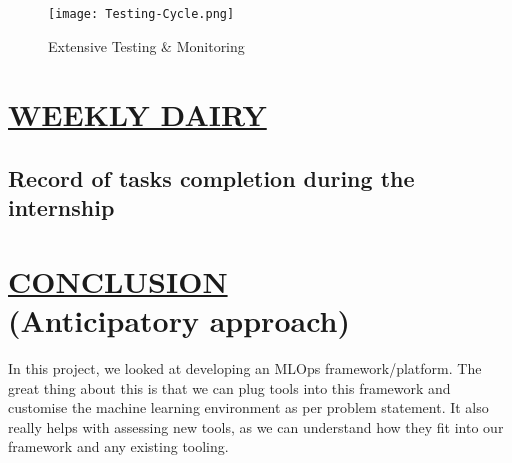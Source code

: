 \documentclass[12pt,oneside,a4paper]{report}
\begin{document}
\begin{figure}[h]
\centering
\texttt{[image: Testing-Cycle.png]}
\caption{Extensive Testing \& Monitoring}
\label{fig_TestingCycle}
\end{figure}


\chapter{\underline{WEEKLY DAIRY}}\vspace{-15.0mm}
\section{Record of tasks completion during the internship}
\begin{table}[ht]
\centering
{}
\end{table}

\chapter{\underline{CONCLUSION}\\\large{(Anticipatory approach)}}
In this project, we looked at developing an MLOps framework/platform. The great thing about this is that we can plug tools into this framework and customise the machine learning environment as per problem statement. It also really helps with assessing new tools, as we can understand how they fit into our framework and any existing tooling. \vspace{5.0mm}
\end{document}

